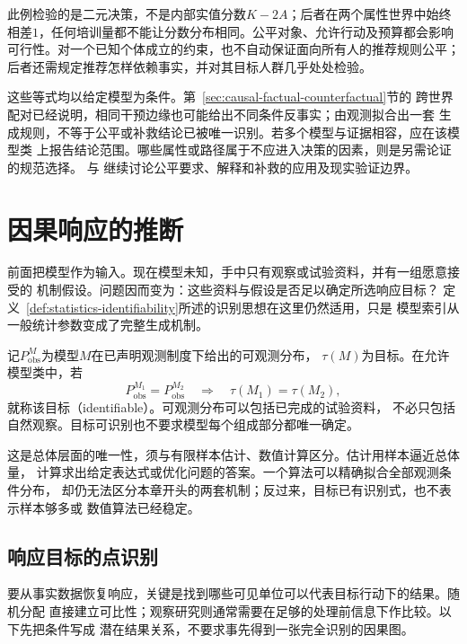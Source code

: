 此例检验的是二元决策，不是内部实值分数\(K-2A\)；后者在两个属性世界中始终
相差\(1\)，任何培训量都不能让分数分布相同。公平对象、允许行动及预算都会影响
可行性。对一个已知个体成立的约束，也不自动保证面向所有人的推荐规则公平；
后者还需规定推荐怎样依赖事实，并对其目标人群几乎处处检验。

这些等式均以给定模型为条件。第~\ref{sec:causal-factual-counterfactual}节的
跨世界配对已经说明，相同干预边缘也可能给出不同条件反事实；由观测拟合出一套
生成规则，不等于公平或补救结论已被唯一识别。若多个模型与证据相容，应在该模型类
上报告结论范围。哪些属性或路径属于不应进入决策的因素，则是另需论证的规范选择。
与
继续讨论公平要求、解释和补救的应用及现实验证边界。

\section{因果响应的推断}
\label{sec:causal-effect-identification}

前面把模型作为输入。现在模型未知，手中只有观察或试验资料，并有一组愿意接受的
机制假设。问题因而变为：这些资料与假设是否足以确定所选响应目标？
定义~\ref{def:statistics-identifiability}所述的识别思想在这里仍然适用，只是
模型索引从一般统计参数变成了完整生成机制。

记\(P_{\mathrm{obs}}^M\)为模型\(M\)在已声明观测制度下给出的可观测分布，
\(\tau(M)\)为目标。在允许模型类中，若
\[
  P_{\mathrm{obs}}^{M_1}=P_{\mathrm{obs}}^{M_2}
  \quad\Longrightarrow\quad \tau(M_1)=\tau(M_2),
\]
就称该目标（identifiable）。可观测分布可以包括已完成的试验资料，
不必只包括自然观察。目标可识别也不要求模型每个组成部分都唯一确定。

这是总体层面的唯一性，须与有限样本估计、数值计算区分。估计用样本逼近总体量，
计算求出给定表达式或优化问题的答案。一个算法可以精确拟合全部观测条件分布，
却仍无法区分本章开头的两套机制；反过来，目标已有识别式，也不表示样本够多或
数值算法已经稳定。

\subsection{响应目标的点识别}
\label{sec:causal-point-identification}

要从事实数据恢复响应，关键是找到哪些可见单位可以代表目标行动下的结果。随机分配
直接建立可比性；观察研究则通常需要在足够的处理前信息下作比较。以下先把条件写成
潜在结果关系，不要求事先得到一张完全识别的因果图。

